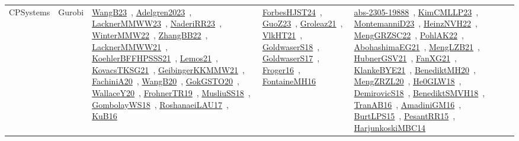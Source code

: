 {\begin{longtable}{lp{3cm}>{\raggedright\arraybackslash}p{6cm}>{\raggedright\arraybackslash}p{6cm}>{\raggedright\arraybackslash}p{8cm}}
CPSystems & Gurobi & \href{../works/WangB23.pdf}{WangB23}~\cite{WangB23}, \href{../works/Adelgren2023.pdf}{Adelgren2023}~\cite{Adelgren2023}, \href{../works/LacknerMMWW23.pdf}{LacknerMMWW23}~\cite{LacknerMMWW23}, \href{../works/NaderiRR23.pdf}{NaderiRR23}~\cite{NaderiRR23}, \href{../works/WinterMMW22.pdf}{WinterMMW22}~\cite{WinterMMW22}, \href{../works/ZhangBB22.pdf}{ZhangBB22}~\cite{ZhangBB22}, \href{../works/LacknerMMWW21.pdf}{LacknerMMWW21}~\cite{LacknerMMWW21}, \href{../works/KoehlerBFFHPSSS21.pdf}{KoehlerBFFHPSSS21}~\cite{KoehlerBFFHPSSS21}, \href{../works/Lemos21.pdf}{Lemos21}~\cite{Lemos21}, \href{../works/KovacsTKSG21.pdf}{KovacsTKSG21}~\cite{KovacsTKSG21}, \href{../works/GeibingerKKMMW21.pdf}{GeibingerKKMMW21}~\cite{GeibingerKKMMW21}, \href{../works/FachiniA20.pdf}{FachiniA20}~\cite{FachiniA20}, \href{../works/WangB20.pdf}{WangB20}~\cite{WangB20}, \href{../works/GokGSTO20.pdf}{GokGSTO20}~\cite{GokGSTO20}, \href{../works/WallaceY20.pdf}{WallaceY20}~\cite{WallaceY20}, \href{../works/FrohnerTR19.pdf}{FrohnerTR19}~\cite{FrohnerTR19}, \href{../works/MusliuSS18.pdf}{MusliuSS18}~\cite{MusliuSS18}, \href{../works/GombolayWS18.pdf}{GombolayWS18}~\cite{GombolayWS18}, \href{../works/RoshanaeiLAU17.pdf}{RoshanaeiLAU17}~\cite{RoshanaeiLAU17}, \href{../works/KuB16.pdf}{KuB16}~\cite{KuB16} & \href{../works/ForbesHJST24.pdf}{ForbesHJST24}~\cite{ForbesHJST24}, \href{../works/GuoZ23.pdf}{GuoZ23}~\cite{GuoZ23}, \href{../works/Groleaz21.pdf}{Groleaz21}~\cite{Groleaz21}, \href{../works/VlkHT21.pdf}{VlkHT21}~\cite{VlkHT21}, \href{../works/GoldwaserS18.pdf}{GoldwaserS18}~\cite{GoldwaserS18}, \href{../works/GoldwaserS17.pdf}{GoldwaserS17}~\cite{GoldwaserS17}, \href{../works/Froger16.pdf}{Froger16}~\cite{Froger16}, \href{../works/FontaineMH16.pdf}{FontaineMH16}~\cite{FontaineMH16} & \href{../works/abs-2305-19888.pdf}{abs-2305-19888}~\cite{abs-2305-19888}, \href{../works/KimCMLLP23.pdf}{KimCMLLP23}~\cite{KimCMLLP23}, \href{../works/MontemanniD23.pdf}{MontemanniD23}~\cite{MontemanniD23}, \href{../works/HeinzNVH22.pdf}{HeinzNVH22}~\cite{HeinzNVH22}, \href{../works/MengGRZSC22.pdf}{MengGRZSC22}~\cite{MengGRZSC22}, \href{../works/PohlAK22.pdf}{PohlAK22}~\cite{PohlAK22}, \href{../works/AbohashimaEG21.pdf}{AbohashimaEG21}~\cite{AbohashimaEG21}, \href{../works/MengLZB21.pdf}{MengLZB21}~\cite{MengLZB21}, \href{../works/HubnerGSV21.pdf}{HubnerGSV21}~\cite{HubnerGSV21}, \href{../works/FanXG21.pdf}{FanXG21}~\cite{FanXG21}, \href{../works/KlankeBYE21.pdf}{KlankeBYE21}~\cite{KlankeBYE21}, \href{../works/BenediktMH20.pdf}{BenediktMH20}~\cite{BenediktMH20}, \href{../works/MengZRZL20.pdf}{MengZRZL20}~\cite{MengZRZL20}, \href{../works/He0GLW18.pdf}{He0GLW18}~\cite{He0GLW18}, \href{../works/DemirovicS18.pdf}{DemirovicS18}~\cite{DemirovicS18}, \href{../works/BenediktSMVH18.pdf}{BenediktSMVH18}~\cite{BenediktSMVH18}, \href{../works/TranAB16.pdf}{TranAB16}~\cite{TranAB16}, \href{../works/AmadiniGM16.pdf}{AmadiniGM16}~\cite{AmadiniGM16}, \href{../works/BurtLPS15.pdf}{BurtLPS15}~\cite{BurtLPS15}, \href{../works/PesantRR15.pdf}{PesantRR15}~\cite{PesantRR15}, \href{../works/HarjunkoskiMBC14.pdf}{HarjunkoskiMBC14}~\cite{HarjunkoskiMBC14}\\

\end{longtable}}
